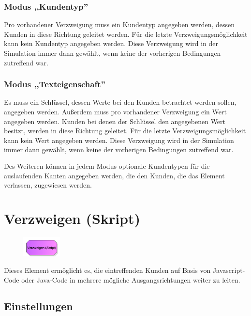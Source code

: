 \subsubsection*{Modus ,,Kundentyp''}

Pro vorhandener Verzweigung muss ein Kundentyp angegeben werden, dessen Kunden in diese Richtung
geleitet werden. Für die letzte Verzweigungsmöglichkeit kann kein Kundentyp angegeben werden. Diese Verzweigung
wird in der Simulation immer dann gewählt, wenn keine der vorherigen Bedingungen zutreffend war.

\subsubsection*{Modus ,,Texteigenschaft''}

Es muss ein Schlüssel, dessen Werte bei den Kunden betrachtet werden sollen, angegeben werden.
Außerdem muss pro vorhandener Verzweigung ein Wert angegeben werden. Kunden bei denen der Schlüssel
den angegebenen Wert besitzt, werden in diese Richtung geleitet. Für die letzte Verzweigungsmöglichkeit
kann kein Wert angegeben werden. Diese Verzweigung wird in der Simulation immer dann gewählt,
wenn keine der vorherigen Bedingungen zutreffend war.

Des Weiteren können in jedem Modus optionale Kundentypen für die auslaufenden Kanten angegeben
werden, die den Kunden, die das Element verlassen, zugewiesen werden.


\section{Verzweigen (Skript)}
\label{ref:ModelElementDecideJS}

\begin{figure}
\vspace{-22pt}
\includegraphics[width=2cm]{imageModelElementDecideJS.png}
\vspace{-22pt}
\end{figure}

Dieses Element ermöglicht es, die eintreffenden Kunden auf Basis von Javascript-Code
oder Java-Code in mehrere mögliche Ausgangsrichtungen weiter zu leiten.

\subsection*{Einstellungen}

